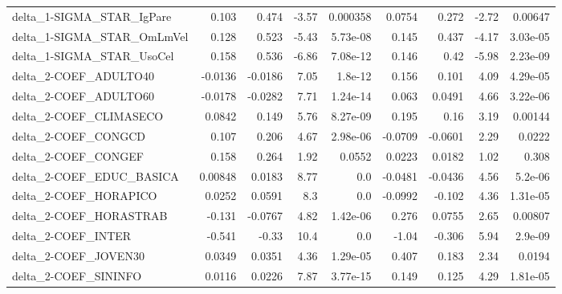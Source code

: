 \begin{tabular}{lrrrrrrrr}
delta\_1-SIGMA\_STAR\_IgPare             &       0.103 &        0.474 &   -3.57 & 0.000358 &     0.0754 &       0.272 &        -2.72 &       0.00647 \\
delta\_1-SIGMA\_STAR\_OmLmVel            &       0.128 &        0.523 &   -5.43 & 5.73e-08 &      0.145 &       0.437 &        -4.17 &      3.03e-05 \\
delta\_1-SIGMA\_STAR\_UsoCel             &       0.158 &        0.536 &   -6.86 & 7.08e-12 &      0.146 &        0.42 &        -5.98 &      2.23e-09 \\
delta\_2-COEF\_ADULTO40                 &     -0.0136 &      -0.0186 &    7.05 &  1.8e-12 &      0.156 &       0.101 &         4.09 &      4.29e-05 \\
delta\_2-COEF\_ADULTO60                 &     -0.0178 &      -0.0282 &    7.71 & 1.24e-14 &      0.063 &      0.0491 &         4.66 &      3.22e-06 \\
delta\_2-COEF\_CLIMASECO                &      0.0842 &        0.149 &    5.76 & 8.27e-09 &      0.195 &        0.16 &         3.19 &       0.00144 \\
delta\_2-COEF\_CONGCD                   &       0.107 &        0.206 &    4.67 & 2.98e-06 &    -0.0709 &     -0.0601 &         2.29 &        0.0222 \\
delta\_2-COEF\_CONGEF                   &       0.158 &        0.264 &    1.92 &   0.0552 &     0.0223 &      0.0182 &         1.02 &         0.308 \\
delta\_2-COEF\_EDUC\_BASICA              &     0.00848 &       0.0183 &    8.77 &      0.0 &    -0.0481 &     -0.0436 &         4.56 &       5.2e-06 \\
delta\_2-COEF\_HORAPICO                 &      0.0252 &       0.0591 &     8.3 &      0.0 &    -0.0992 &      -0.102 &         4.36 &      1.31e-05 \\
delta\_2-COEF\_HORASTRAB                &      -0.131 &      -0.0767 &    4.82 & 1.42e-06 &      0.276 &      0.0755 &         2.65 &       0.00807 \\
delta\_2-COEF\_INTER                    &      -0.541 &        -0.33 &    10.4 &      0.0 &      -1.04 &      -0.306 &         5.94 &       2.9e-09 \\
delta\_2-COEF\_JOVEN30                  &      0.0349 &       0.0351 &    4.36 & 1.29e-05 &      0.407 &       0.183 &         2.34 &        0.0194 \\
delta\_2-COEF\_SININFO                  &      0.0116 &       0.0226 &    7.87 & 3.77e-15 &      0.149 &       0.125 &         4.29 &      1.81e-05 \\

\end{tabular}
